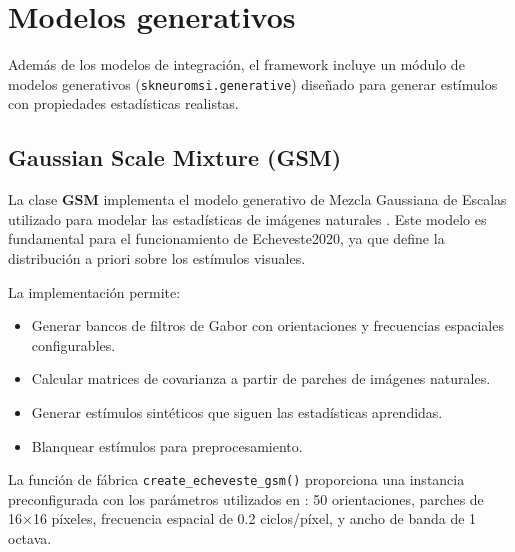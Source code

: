 


\section{Modelos generativos}
\label{sec:snmsi_generativos}

Además de los modelos de integración, el framework incluye un módulo de modelos generativos (\texttt{skneuromsi.generative}) diseñado para generar estímulos con propiedades estadísticas realistas.

\subsection{Gaussian Scale Mixture (GSM)}
\label{subsec:snmsi_gsm}

La clase \textbf{GSM} implementa el modelo generativo de Mezcla Gaussiana de Escalas utilizado para modelar las estadísticas de imágenes naturales \citep{wainwright1999scale}. Este modelo es fundamental para el funcionamiento de Echeveste2020, ya que define la distribución a priori sobre los estímulos visuales.

La implementación permite:
\begin{itemize}
    \item Generar bancos de filtros de Gabor con orientaciones y frecuencias espaciales configurables.
    \item Calcular matrices de covarianza a partir de parches de imágenes naturales.
    \item Generar estímulos sintéticos que siguen las estadísticas aprendidas.
    \item Blanquear estímulos para preprocesamiento.
\end{itemize}

La función de fábrica \texttt{create\_echeveste\_gsm()} proporciona una instancia preconfigurada con los parámetros utilizados en \citet{echeveste2020cortical}: 50 orientaciones, parches de 16×16 píxeles, frecuencia espacial de 0.2 ciclos/píxel, y ancho de banda de 1 octava.


